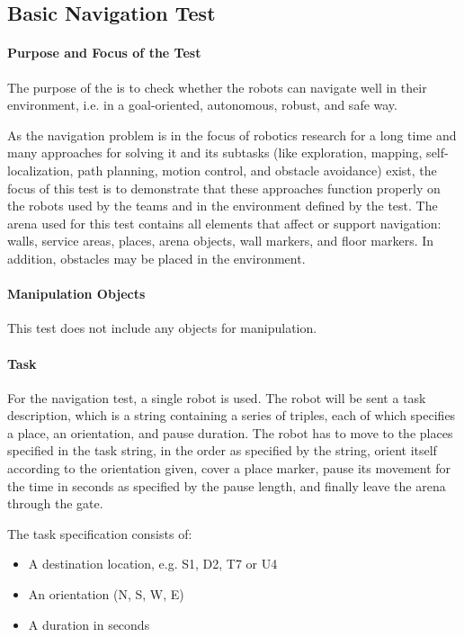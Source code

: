 \subsection{Basic Navigation Test}

\paragraph{Purpose and Focus of the Test}
The purpose of the  is to check whether the robots can navigate well in their environment, i.e. in a goal-oriented, autonomous, robust, and safe way.
\par
As the navigation problem is in the focus of robotics research for a long time and many approaches for solving it and its subtasks (like exploration, mapping, self-localization, path planning, motion control, and obstacle avoidance) exist, the focus of this test is to demonstrate that these approaches function properly on the robots used by the teams and in the environment defined by the test.
The arena used for this test contains all elements that affect or support navigation: walls, service areas, places, arena objects, wall markers, and floor markers. In addition, obstacles may be placed in the environment.
\par
\paragraph{Manipulation Objects}
This test does not include any objects for manipulation.
\paragraph{Task}
For the navigation test, a single robot is used. The robot will be sent a task description, which is a string containing a series of triples, each of which specifies a place, an orientation, and pause duration. The robot has to move to the places specified in the task string, in the order as specified by the string, orient itself according to the orientation given, cover a place marker, pause its movement for the time in seconds as specified by the pause length, and finally leave the arena through the gate.

The task specification consists of:

\begin{itemize}
	\item A destination location, e.g. S1, D2, T7 or U4
	\item An orientation (N, S, W, E)
	\item A duration in seconds
\end{itemize}


